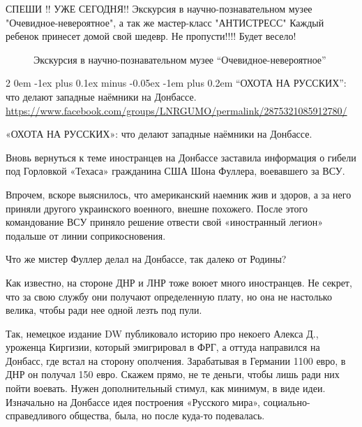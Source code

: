\documentclass[a4paper,11pt]{extreport}
\makeatletter
\renewcommand\subsection{%
  \clearpage
    \@startsection{subsection}%
    {2}%
    {0em}%
    {-1ex plus 0.1ex minus -0.05ex}%
    {-1em plus 0.2em}%
    {\scshape\bfseries\Large}%
}
\makeatother
\begin{document}

СПЕШИ !! УЖЕ СЕГОДНЯ!! Экскурсия в научно-познавательном музее
"Очевидное-невероятное", а так же мастер-класс "АНТИСТРЕСС" Каждый ребенок
принесет домой свой шедевр. Не пропусти!!!! Будет весело!
  
\begin{figure}[ht]
 \centering
 \caption{Экскурсия в научно-познавательном музее ``Очевидное-невероятное''}
 \label{fig:}
\end{figure}
 
 
\subsection{``ОХОТА НА РУССКИХ'': что делают западные наёмники на Донбассе.}
\label{sec:25_07_2020.fb.lnr.2}
\url{https://www.facebook.com/groups/LNRGUMO/permalink/2875321085912780/}

«ОХОТА НА РУССКИХ»: что делают западные наёмники на Донбассе.

Вновь вернуться к теме иностранцев на Донбассе заставила информация о гибели
под Горловкой «Техаса» гражданина США Шона Фуллера, воевавшего за ВСУ.

Впрочем, вскоре выяснилось, что американский наемник жив и здоров, а за него
приняли другого украинского военного, внешне похожего.  После этого
командование ВСУ приняло решение отвести свой «иностранный легион» подальше от
линии соприкосновения.

Что же мистер Фуллер делал на Донбассе, так далеко от Родины?

Как известно, на стороне ДНР и ЛНР тоже воюет много иностранцев.  Не секрет,
что за свою службу они получают определенную плату, но она не настолько велика,
чтобы ради нее одной лезть под пули.

Так, немецкое издание DW публиковало историю про некоего Алекса Д., уроженца
Киргизии, который эмигрировал в ФРГ, а оттуда направился на Донбасс, где встал
на сторону ополчения. Зарабатывая в Германии 1100 евро, в ДНР он получал 150
евро. Скажем прямо, не те деньги, чтобы лишь ради них пойти воевать.  Нужен
дополнительный стимул, как минимум, в виде идеи.  Изначально на Донбассе идея
построения «Русского мира», социально-справедливого общества, была, но после
куда-то подевалась.
\end{document}
